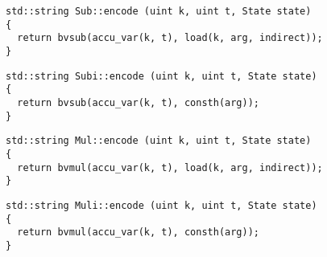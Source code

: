 
\begin{lstlisting}[style=c++,aboveskip=-\encodeskip,belowskip=\encodeskip]
std::string Sub::encode (uint k, uint t, State state)
{
  return bvsub(accu_var(k, t), load(k, arg, indirect));
}
\end{lstlisting}


\begin{lstlisting}[style=c++,aboveskip=-\encodeskip,belowskip=\encodeskip]
std::string Subi::encode (uint k, uint t, State state)
{
  return bvsub(accu_var(k, t), consth(arg));
}
\end{lstlisting}


\newpage

\begin{lstlisting}[style=c++,aboveskip=-\encodeskip,belowskip=\encodeskip]
std::string Mul::encode (uint k, uint t, State state)
{
  return bvmul(accu_var(k, t), load(k, arg, indirect));
}
\end{lstlisting}


\begin{lstlisting}[style=c++,aboveskip=-\encodeskip,belowskip=\encodeskip]
std::string Muli::encode (uint k, uint t, State state)
{
  return bvmul(accu_var(k, t), consth(arg));
}
\end{lstlisting}


